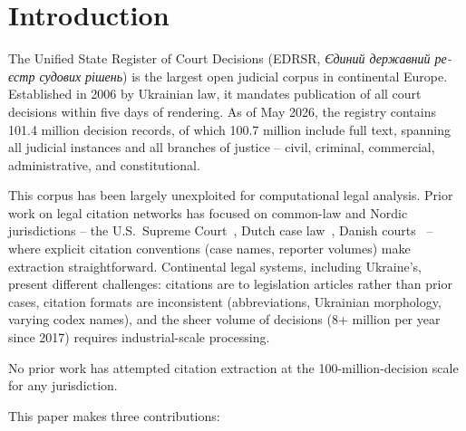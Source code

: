 \documentclass[11pt]{article}
\begin{document}
\section{Introduction}
\label{sec:intro}

The Unified State Register of Court Decisions (EDRSR, \emph{\foreignlanguage{ukrainian}{Єдиний державний реєстр судових рішень}}) is the largest open judicial corpus in continental Europe.
Established in 2006 by Ukrainian law, it mandates publication of all court decisions within five days of rendering.
As of May 2026, the registry contains 101.4 million decision records, of which 100.7 million include full text, spanning all judicial instances and all branches of justice -- civil, criminal, commercial, administrative, and constitutional.

This corpus has been largely unexploited for computational legal analysis.
Prior work on legal citation networks has focused on common-law and Nordic jurisdictions -- the U.S.\ Supreme Court~\citep{fowler2007network}, Dutch case law~\citep{winkels2011determining}, Danish courts~\citep{mones2021emergence} -- where explicit citation conventions (case names, reporter volumes) make extraction straightforward.
Continental legal systems, including Ukraine's, present different challenges: citations are to legislation articles rather than prior cases, citation formats are inconsistent (abbreviations, Ukrainian morphology, varying codex names), and the sheer volume of decisions (8+ million per year since 2017) requires industrial-scale processing.

No prior work has attempted citation extraction at the 100-million-decision scale for any jurisdiction.

This paper makes three contributions:
\end{document}
